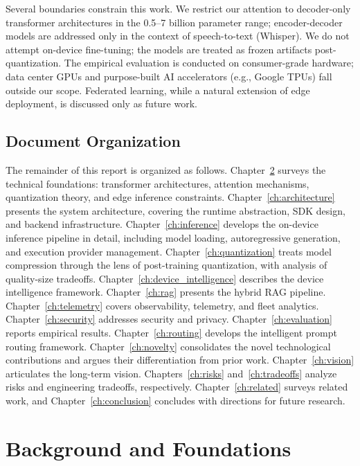 \documentclass[12pt, letterpaper, twoside]{report}
\begin{document}
Several boundaries constrain this work. We restrict our attention to decoder-only transformer architectures in the 0.5--7 billion parameter range; encoder-decoder models are addressed only in the context of speech-to-text (Whisper). We do not attempt on-device fine-tuning; the models are treated as frozen artifacts post-quantization. The empirical evaluation is conducted on consumer-grade hardware; data center GPUs and purpose-built AI accelerators (e.g., Google TPUs) fall outside our scope. Federated learning, while a natural extension of edge deployment, is discussed only as future work.

\section{Document Organization}
\label{sec:organization}

The remainder of this report is organized as follows. Chapter~\ref{ch:background} surveys the technical foundations: transformer architectures, attention mechanisms, quantization theory, and edge inference constraints. Chapter~\ref{ch:architecture} presents the system architecture, covering the runtime abstraction, SDK design, and backend infrastructure. Chapter~\ref{ch:inference} develops the on-device inference pipeline in detail, including model loading, autoregressive generation, and execution provider management. Chapter~\ref{ch:quantization} treats model compression through the lens of post-training quantization, with analysis of quality-size tradeoffs. Chapter~\ref{ch:device_intelligence} describes the device intelligence framework. Chapter~\ref{ch:rag} presents the hybrid RAG pipeline. Chapter~\ref{ch:telemetry} covers observability, telemetry, and fleet analytics. Chapter~\ref{ch:security} addresses security and privacy. Chapter~\ref{ch:evaluation} reports empirical results. Chapter~\ref{ch:routing} develops the intelligent prompt routing framework. Chapter~\ref{ch:novelty} consolidates the novel technological contributions and argues their differentiation from prior work. Chapter~\ref{ch:vision} articulates the long-term vision. Chapters~\ref{ch:risks} and~\ref{ch:tradeoffs} analyze risks and engineering tradeoffs, respectively. Chapter~\ref{ch:related} surveys related work, and Chapter~\ref{ch:conclusion} concludes with directions for future research.

\chapter{Background and Foundations}
\label{ch:background}
\end{document}
